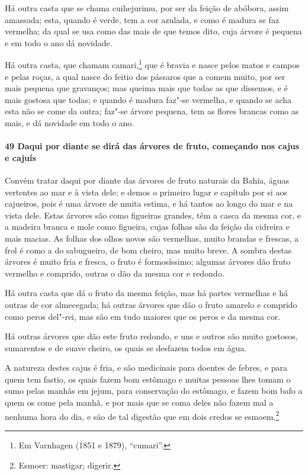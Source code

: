 \begin{linenumbers}
Há outra casta que se chama cuihejurimu, por ser da feição de abóbora, assim amassada;
esta, quando é verde, tem a cor azulada, e como é madura se faz vermelha; da qual se usa
como das mais de que temos dito, cuja árvore é pequena e em todo o ano dá novidade.

Há outra casta, que chamam camari,\footnote{ Em Varnhagen (1851 e 1879), ``cumari''.} que
é bravia e nasce pelos matos e campos e pelas roças, a qual nasce do feitio dos pássaros
que a comem muito, por ser mais pequena que gravanços; mas queima mais que todas as que
dissemos, e é mais gostosa que todas; e quando é madura faz"-se vermelha, e quando se acha
esta não se come da outra; faz"-se árvore pequena, tem as flores brancas como as mais, e dá
novidade em todo o ano.

\paragraph{49 Daqui por diante se dirá das árvores de fruto, começando nos cajus e cajuís}\quad
Convém tratar daqui por diante das árvores de fruto naturais da Bahia, águas vertentes ao
mar e à vista dele; e demos o primeiro lugar e capítulo por si aos cajueiros, pois é uma
árvore de muita estima, e há tantos ao longo do mar e na vista dele. Estas árvores são
como figueiras grandes, têm a casca da mesma cor, e a madeira branca e mole como figueira,
cujas folhas são da feição da cidreira e mais macias. As folhas dos olhos novos são
vermelhas, muito brandas e frescas, a frol é como a do sabugueiro, de bom cheiro, mas
muito breve. A sombra destas árvores é muito fria e fresca, o fruto é formosíssimo;
algumas árvores dão fruto vermelho e comprido, outras o dão da mesma cor e redondo.

Há outra casta que dá o fruto da mesma feição, mas há partes vermelhas e há outras de cor
almecegada; há outras árvores que dão o fruto amarelo e comprido como peros del"-rei, mas
são em tudo maiores que os peros e da mesma cor.

Há outras árvores que dão este fruto redondo, e uns e outros são muito gostosos,
sumarentos e de suave cheiro, os quais se desfazem todos em água.

A natureza destes cajus é fria, e são medicinais para doentes de febres, e para quem tem
fastio, os quais fazem bom estômago e muitas pessoas lhes tomam o sumo pelas manhãs em
jejum, para conservação do estômago, e fazem bom bafo a quem os come pela manhã, e por
mais que se coma deles não fazem mal a nenhuma hora do dia, e são de tal digestão que em
dois credos se esmoem.\footnote{ Esmoer: mastigar; digerir.}



\end{linenumbers}
